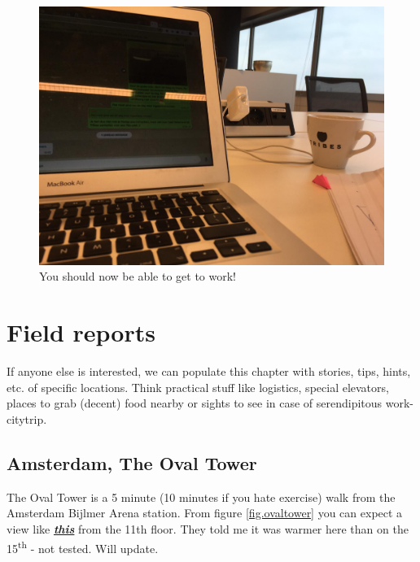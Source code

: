 \documentclass[11pt,a4paper,sans]{report} %
\begin{document}
\begin{figure}[htp]
	\centering
		\includegraphics[width=1.0\linewidth]{images/amsovaltower/koffieenstroom}
	\caption{You should now be able to get to work!}
	\label{fig.coffeeandpower}
\end{figure}

\chapter{Field reports}

If anyone else is interested, we can populate this chapter with stories, tips, hints, etc. of specific locations. Think practical stuff like logistics, special elevators, places to grab (decent) food nearby or sights to see in case of serendipitous work-citytrip.

\section{Amsterdam, The Oval Tower}
The Oval Tower is a 5 minute (10 minutes if you hate exercise) walk from the Amsterdam Bijlmer Arena station. From figure \ref{fig.ovaltower} you can expect a view like \href{https://youtu.be/6oQ-9Qe8CHE}{\textbf{\emph{this}}} from the 11th floor. They told me it was warmer here than on the 15\textsuperscript{th} - not tested. Will update.
\end{document}
